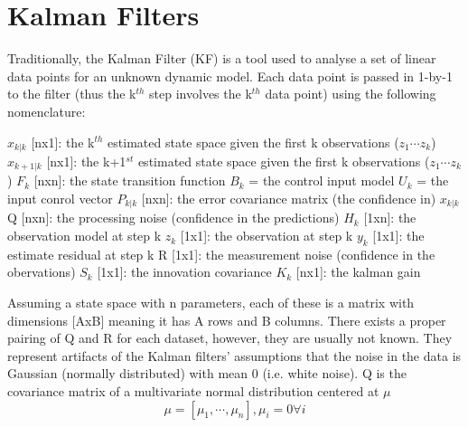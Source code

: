 \section{Kalman Filters}
Traditionally, the Kalman Filter (KF) is a tool used to analyse a set of linear data points for an unknown dynamic model. Each data point is passed in 1-by-1 to the filter (thus the k$^{th}$ step involves the k$^{th}$ data point) using the following nomenclature:\newline

$\hat{x}_{k|k}$ [nx1]:    the k$^{th}$ estimated state space given the first k observations ($z_{1} \cdots z_{k}$)\newline
$\hat{x}_{k+1|k}$ [nx1]:  the k+1$^{st}$ estimated state space given the first k observations ($z_{1} \cdots z_{k}$)\newline
$F_{k}$ [nxn]:  the state transition function\newline
$B_{k}$ = the control input model \newline
$U_{k}$ = the input conrol vector\newline
$P_{k|k}$ [nxn]:  the error covariance matrix (the confidence in) $x_{k|k}$\newline
Q [nxn]:    the processing noise (confidence in the predictions)\newline
$H_{k}$ [1xn]: the observation model at step k\newline
$z_{k}$ [1x1]: the observation at step k\newline
$y_{k}$ [1x1]: the estimate residual at step k\newline
R [1x1]: the measurement noise (confidence in the obervations)\newline
$S_{k}$ [1x1]: the innovation covariance\newline
$K_{k}$ [nx1]: the kalman gain\newline

Assuming a state space with n parameters, each of these is a matrix with dimensions [AxB] meaning it has A rows and B columns. There exists a proper pairing of Q and R for each dataset, however, they are usually not known. They represent artifacts of the Kalman filters' assumptions that the noise in the data is Gaussian (normally distributed) with mean 0 (i.e. white noise). Q is the covariance matrix of a multivariate normal distribution centered at $\mu$
\begin{equation}
    \mu = [\mu_{1}, \cdots , \mu_{n}], \mu_{i} = 0  \forall i
\end{equation}

